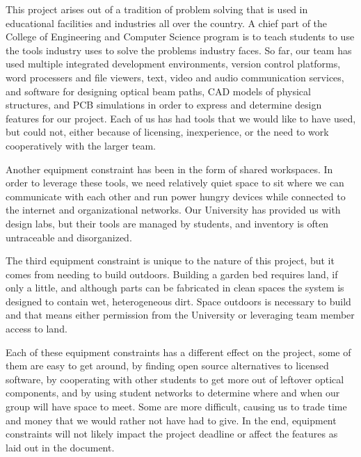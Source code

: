 This project arises out of a tradition of problem solving that is used in educational facilities and industries all over the country. A chief part of the College of Engineering and Computer Science program is to teach students to use the tools industry uses to solve the problems industry faces. So far, our team has used multiple integrated development environments, version control platforms, word processers and file viewers, text, video and audio communication services, and software for designing optical beam paths, CAD models of physical structures, and PCB simulations in order to express and determine design features for our project. Each of us has had tools that we would like to have used, but could not, either because of licensing, inexperience, or the need to work cooperatively with the larger team. 

Another equipment constraint has been in the form of shared workspaces. In order to leverage these tools, we need relatively quiet space to sit where we can communicate with each other and run power hungry devices while connected to the internet and organizational networks. Our University has provided us with design labs, but their tools are managed by students, and inventory is often untraceable and disorganized. 

The third equipment constraint is unique to the nature of this project, but it comes from needing to build outdoors. Building a garden bed requires land, if only a little, and although parts can be fabricated in clean spaces the system is designed to contain wet, heterogeneous dirt. Space outdoors is necessary to build and that means either permission from the University or leveraging team member access to land. 

Each of these equipment constraints has a different effect on the project, some of them are easy to get around, by finding open source alternatives to licensed software, by cooperating with other students to get more out of leftover optical components, and by using student networks to determine where and when our group will have space to meet. Some are more difficult, causing us to trade time and money that we would rather not have had to give. In the end, equipment constraints will not likely impact the project deadline or affect the features as laid out in the document.

